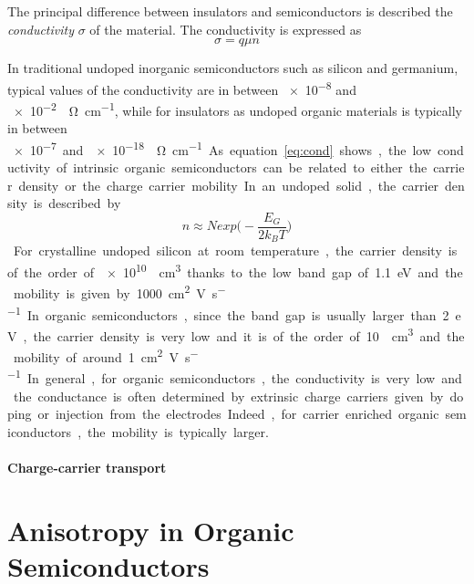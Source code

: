 \documentclass  [
  paper    = a4,
  BCOR     = 10mm,
  twoside,
  fontsize = 12pt,
  fleqn,
  toc      = bibnumbered,
  toc      = listofnumbered,
  numbers  = noendperiod,
  headings = normal,
  listof   = leveldown,
  version  = 3.03
]                                       {scrreprt}
\begin{document}
The principal difference between insulators and semiconductors is described the \emph{conductivity} $\sigma$ of the material. The conductivity is expressed as
\begin{equation}
\sigma = q \mu n
\label{eq:cond}
\end{equation}


In traditional undoped inorganic semiconductors such as silicon and germanium, typical values of the conductivity are in between \SI{e-8}{} and \SI{e-2}{\per\ohm\per\centi\meter}, while for insulators as undoped organic materials is typically in between \SI{e-7} and \SI{e-18}{\per\ohm\per\centi\meter}. As equation \ref{eq:cond} shows, the low conductivity of intrinsic organic semiconductors can be related to either the carrier density or the charge carrier mobility. In an undoped solid, the carrier density is described by
\begin{equation}
n \approx Nexp\Big(-\frac{E_G}{2k_BT}\Big)
\label{eq:density}
\end{equation}
For crystalline undoped silicon at room temperature, the carrier density is of the order of \SI{e10}{\per\centi\meter\cubed} thanks to the low band gap of \SI{1.1}{\electronvolt} and the mobility is given by \SI{1000}{\centi\meter\squared\per\volt\per\second}. In organic semiconductors, since the band gap is usually larger than \SI{2}{\electronvolt}, the carrier density is very low and it is of the order of \SI{10}{\per\centi\meter\cubed} and the mobility of around \SI{1}{\centi\meter\squared\per\volt\per\second}. In general, for organic semiconductors, the conductivity is very low and the conductance is often determined by extrinsic charge carriers given by doping or injection from the electrodes. Indeed, for carrier enriched organic semiconductors, the mobility is typically larger. 

\paragraph{Charge-carrier transport} %

	\section{Anisotropy in Organic Semiconductors}
	
\end{document}
